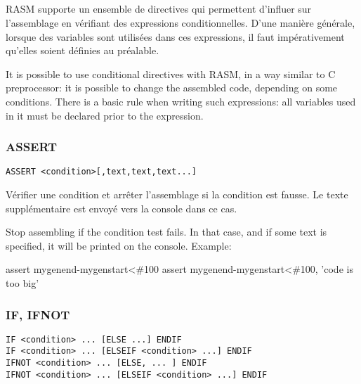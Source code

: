\subsection{}

\begin{xfr}
RASM supporte un ensemble de directives qui permettent d'influer
sur l'assemblage en vérifiant des expressions conditionnelles. D'une manière générale,
lorsque des variables sont utilisées dans ces expressions, il faut impérativement qu'elles
soient définies au préalable.
\end{xfr}


\begin{xen}
It is possible to use conditional directives with RASM, in a way similar to C preprocessor: it is possible to change the assembled code, depending on some conditions. There is a basic rule when writing such expressions: all variables used in it must be declared prior to the expression.
\end{xen}

\subsubsection{ASSERT}

\begin{verbatim}
ASSERT <condition>[,text,text,text...]
\end{verbatim}

\begin{xfr}
Vérifier une condition et arrêter l'assemblage si la condition est fausse. Le texte supplémentaire est envoyé vers la console dans ce cas.
\end{xfr}

\begin{xen}
Stop assembling if the condition test fails. In that case, and if some text is specified, it will be printed on the console. Example:
\end{xen}

\begin{code}
assert mygenend-mygenstart\textless\#100
assert mygenend-mygenstart\textless\#100, 'code is too big'
\end{code}


\subsubsection{IF, IFNOT}
\begin{verbatim}
IF <condition> ... [ELSE ...] ENDIF
IF <condition> ... [ELSEIF <condition> ...] ENDIF
IFNOT <condition> ... [ELSE, ... ] ENDIF
IFNOT <condition> ... [ELSEIF <condition> ...] ENDIF
\end{verbatim}

